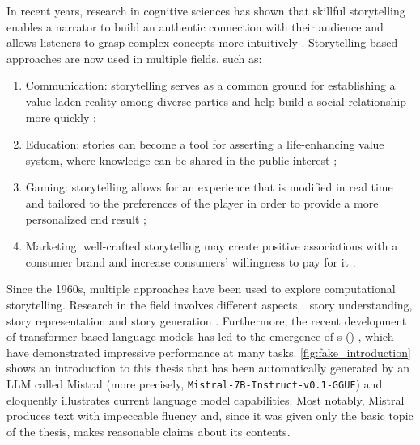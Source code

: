 In recent years, research in cognitive sciences has shown that skillful storytelling enables a narrator to build an authentic connection with their audience and allows listeners to grasp complex concepts more intuitively \citep{suzuki2018dialogues}. Storytelling-based approaches are now used in multiple fields, such as:
\begin{enumerate}
    \item Communication: storytelling serves as a common ground for establishing a value-laden reality among diverse parties and help build a social relationship more quickly \citep{barker2010strategic};
    \item Education: stories can become a tool for asserting a life-enhancing value system, where knowledge can be shared in the public interest \citep{woodhouse2011storytelling};
    \item Gaming: storytelling allows for an experience that is modified in real time and tailored to the preferences of the player in order to provide a more personalized end result \citep{bostan2010interactive};
    \item Marketing: well-crafted storytelling may create positive associations with a consumer brand and increase consumers' willingness to pay for it \citep{lundqvist2013impact}.
\end{enumerate}

Since the 1960s, multiple approaches have been used to explore computational storytelling. Research in the field involves different aspects, \eg\ story understanding, story representation and story generation \citep{alabdulkarim2021automatic}. Furthermore, the recent development of transformer-based language models \citep{vaswani2017attention, devlin-etal-2019-bert} has led to the emergence of {\llmfull}s (\llm) \citep{brown2020language}, which have demonstrated impressive performance at many {\nlpfull} tasks. \autoref{fig:fake_introduction} shows an introduction to this thesis that has been automatically generated by an LLM called Mistral (more precisely, \texttt{Mistral-7B-Instruct-v0.1-GGUF}) and eloquently illustrates current language model capabilities. Most notably, Mistral produces text with impeccable fluency and, since it was given only the basic topic of the thesis, makes reasonable claims about its contents.


